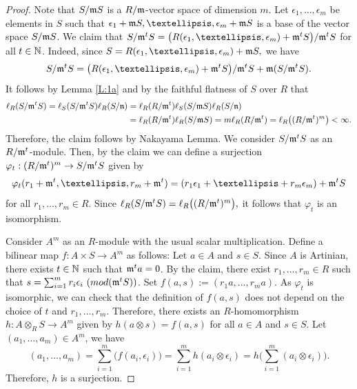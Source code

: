 \documentclass[10pt,a4paper]{amsart}
\begin{document}
\begin{proof} Note that $S/\frak mS$ is a $R/\frak m$-vector space of dimension $m$.  Let $\epsilon_1, \ldots , \epsilon_m$ be elements in $S$ such that $\epsilon_1+\frak mS, \ldots , \epsilon_m+\frak mS$ is a  base of  the vector space $S/\frak mS$. We claim that $S/\frak m^tS=\big(R(\epsilon_1, \ldots , \epsilon_m)+\frak m^tS\big)/\frak m^tS$ for all $t\in\Bbb N$. Indeed, since $S=R(\epsilon_1, \ldots , \epsilon_m)+\frak mS,$ we have 
$$S/\frak m^tS=\big(R(\epsilon_1, \ldots , \epsilon_m)+\frak m^tS\big)/\frak m^tS + \frak m(S/\frak m^tS).$$ 
It follows by Lemma \ref{L:1a} and by the faithful flatness of $S$ over $R$ that 
\begin{align}\ell_R(S/\frak m^tS)=\ell_S(S/\frak m^tS)\ell_R(S/\frak n)&=\ell_R(R/\frak m^t)\ell_S(S/\frak mS)\ell_R(S/\frak n)\notag\\
&=\ell_R(R/\frak m^t)\ell_R(S/\frak mS)=m\ell_R(R/\frak m^t)=\ell_R\big((R/\frak m^t)^m\big)<\infty.\notag\end{align} Therefore, the claim follows by Nakayama Lemma. We consider  $S/\frak m^tS$ as an $R/\frak m^t$-module.  Then, by the claim we can define a surjection  $\varphi_t: (R/\frak m^t)^m\rightarrow S/\frak m^tS$ given by $$\varphi_t(r_1+\frak m^t, \ldots , r_m+\frak m^t)=(r_1\epsilon_1+ \ldots +r_m\epsilon_m)+\frak m^tS$$ for all $r_1, \ldots , r_m\in R.$ Since $\ell_R(S/\frak m^tS)=\ell_R\big((R/\frak m^t)^m\big),$ it follows that $\varphi_t$ is an isomorphism.


  Consider $A^m$ as an $R$-module with the usual scalar multiplication. Define a bilinear map $f: A\times S\rightarrow A^m$ as follows: Let $a\in A$ and $s\in S.$ Since $A$ is Artinian, there exists $t\in\Bbb N$ such that $\frak m^ta=0$. By the claim, there exist $r_1, \ldots , r_m\in R$ such that $s=\sum_{i=1}^m r_i\epsilon_i \ ({\rm mod} (\frak m^tS))$. Set $f(a, s):=(r_1a, \ldots , r_ma).$ As $\varphi_t$ is isomorphic,  we can check that the  definition of  $f(a, s)$ does not depend on the choice of  $t$ and $r_1, \ldots , r_m$.  Therefore, there exists an $R$-homomorphism $h: A \otimes_RS\rightarrow A^m$ given by $h(a\otimes s)=f(a, s)$ for all $a\in A$ and $s\in S.$ Let $(a_1, \ldots , a_m)\in A^m$, we have 
 $$(a_1, \ldots , a_m)=\sum_{i=1}^m\big(f(a_i,\epsilon_i)\big)=\sum_{i=1}^m h(a_i\otimes \epsilon_i)=h\big(\sum_{i=1}^m(a_i\otimes \epsilon_i)\big).$$ Therefore, $h$ is a surjection. 


\end{proof}
\end{document}
